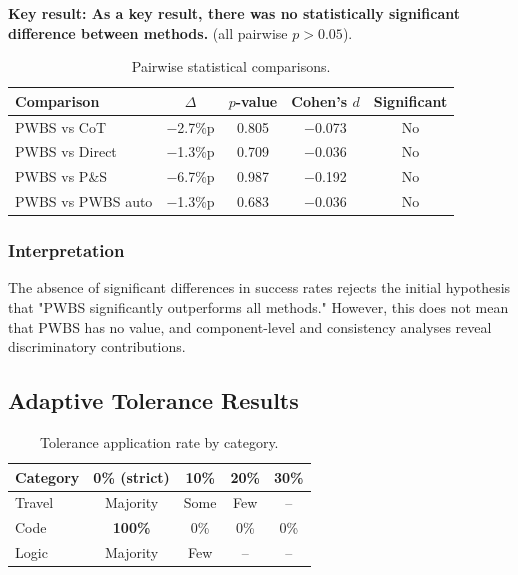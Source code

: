 \documentclass[11pt,a4paper]{article}
\begin{document}
\textbf{Key result: As a key result, there was no statistically significant difference between methods.} (all pairwise $p > 0.05$).

\begin{table}[h]
\centering
\caption{Pairwise statistical comparisons.}
\label{tab:pairwise}
\begin{tabular}{lcccc}
\toprule
\textbf{Comparison} & \textbf{$\Delta$} & \textbf{$p$-value} & \textbf{Cohen's $d$} & \textbf{Significant} \\
\midrule
PWBS vs CoT & $-$2.7\%p & 0.805 & $-$0.073 & No \\
PWBS vs Direct & $-$1.3\%p & 0.709 & $-$0.036 & No \\
PWBS vs P\&S & $-$6.7\%p & 0.987 & $-$0.192 & No \\
PWBS vs PWBS auto & $-$1.3\%p & 0.683 & $-$0.036 & No \\
\bottomrule
\end{tabular}
\end{table}

\subsubsection{Interpretation}

The absence of significant differences in success rates rejects the initial hypothesis that "PWBS significantly outperforms all methods." However, this does not mean that PWBS has no value, and component-level and consistency analyses reveal discriminatory contributions.

\subsection{Adaptive Tolerance Results}

\begin{table}[h]
\centering
\caption{Tolerance application rate by category.}
\label{tab:tolerance-results}
\begin{tabular}{lcccc}
\toprule
\textbf{Category} & \textbf{0\% (strict)} & \textbf{10\%} & \textbf{20\%} & \textbf{30\%} \\
\midrule
Travel & Majority & Some & Few & -- \\
Code & \textbf{100\%} & 0\% & 0\% & 0\% \\
Logic & Majority & Few & -- & -- \\
\bottomrule
\end{tabular}
\end{table}
\end{document}

